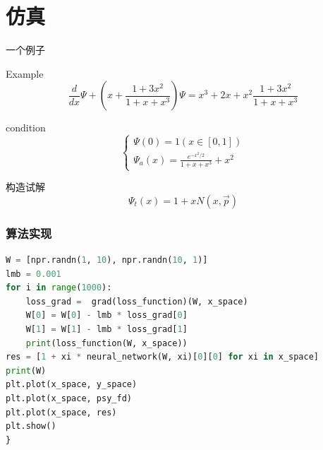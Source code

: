 \documentclass[hyperref,UTF8,11pt]{beamer}
\begin{document}

\section{仿真}

\begin{frame}{一个例子}
    \begin{exampleblock}{Example}
		\begin{equation}
			\frac{d}{d x} \Psi+\left(x+\frac{1+3 x^{2}}{1+x+x^{3}}\right) \Psi=x^{3}+2 x+x^{2} \frac{1+3 x^{2}}{1+x+x^{3}}
			\label{eq:example}
		\end{equation}
    \end{exampleblock}
    \begin{alertblock}{condition}
		\begin{equation}
			\left\{ \begin{array}{l}
			\Psi (0) = 1\left( {x \in [0,1]} \right)\\
			{\Psi _a}(x) = \frac{{{e^{ - {x^2}/2}}}}{{1 + x + {x^3}}} + {x^2}
			\end{array} \right.
		\end{equation}
    \end{alertblock}
	\begin{block}{构造试解}
		\begin{equation}
			\Psi_{t}(x)=1+x N(x, \vec{p})
		\end{equation}
	\end{block}
\end{frame}

\begin{frame}[fragile]
    \frametitle{算法实现}
    \begin{lstlisting}[language=python]
W = [npr.randn(1, 10), npr.randn(10, 1)]
lmb = 0.001
for i in range(1000):
    loss_grad =  grad(loss_function)(W, x_space)
    W[0] = W[0] - lmb * loss_grad[0]
    W[1] = W[1] - lmb * loss_grad[1]
	print(loss_function(W, x_space))
res = [1 + xi * neural_network(W, xi)[0][0] for xi in x_space] 
print(W)
plt.plot(x_space, y_space) 
plt.plot(x_space, psy_fd)
plt.plot(x_space, res)
plt.show()
}\end{lstlisting}
\end{frame}
\end{document}
